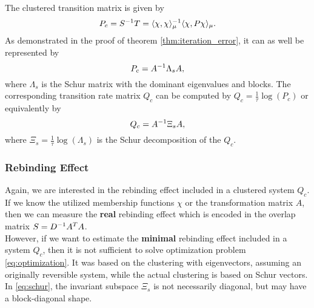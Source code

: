 The clustered transition matrix is given by
\begin{equation*}
P_c = S^{-1} T =  \langle \chi, \chi \rangle_\mu^{-1} \langle \chi, P \chi \rangle_\mu.
\end{equation*}
As demonstrated in the proof of theorem \ref{thm:iteration_error}, it can as well be represented by
\begin{equation*}
P_c = A^{-1} \Lambda_s A,
\end{equation*}
where $\Lambda_s$ is the Schur matrix with the dominant eigenvalues and blocks. %
The corresponding transition rate matrix $Q_c$ can be computed by $Q_c = \frac{1}{\tau} \log(P_c)$ or equivalently by
\begin{equation}
\label{eq:schur}
Q_c = A^{-1} \Xi_s A,
\end{equation}
where $\Xi_s = \frac{1}{\tau} \log(\Lambda_s)$ is the Schur decomposition of the $Q_c$. %

\subsubsection*{Rebinding Effect}

Again, we are interested in the rebinding effect included in a clustered system $Q_c$. %
If we know the utilized membership functions $\chi$ or the transformation matrix $A$, then we can measure the \textbf{real} rebinding effect which is encoded in the overlap matrix $S = D^{-1} A^T A$.
\\

However, if we want to estimate the \textbf{minimal} rebinding effect included in a system $Q_c$, then it is not sufficient to solve optimization problem \eqref{eq:optimization}. %
It was based on the clustering with eigenvectors, assuming an originally reversible system, while the actual clustering is based on Schur vectors. In \eqref{eq:schur}, the invariant subspace $\Xi_s$ is not necessarily diagonal, but may have a block-diagonal shape. %

